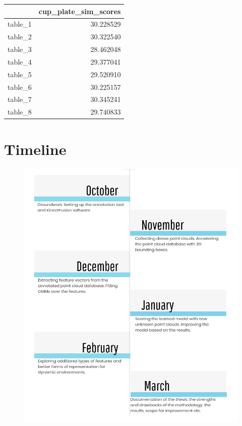 \documentclass[12pt]{article}
\begin{document}
\begin{tabular}{lr}
\toprule
{} &  cup\_plate\_sim\_scores \\
\midrule
table\_1 &             30.228529 \\
table\_2 &             30.322540 \\
table\_3 &             28.462048 \\
table\_4 &             29.377041 \\
table\_5 &             29.520910 \\
table\_6 &             30.225157 \\

table\_7 &             30.345241 \\
table\_8 &             29.740833 \\
\bottomrule
\end{tabular}

\section{Timeline}

\begin{figure} [H]
\includegraphics[scale = 0.60]{timeline3.png}
\centering

\end{figure}
\end{document}
